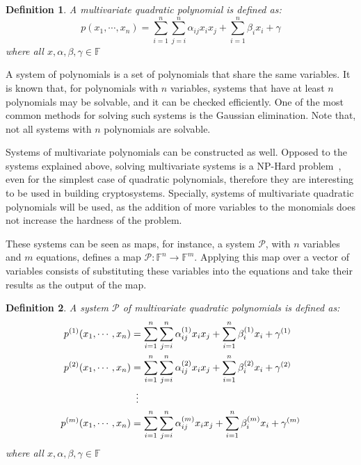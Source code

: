 \documentclass{ufsctex/ufsctex}
\newtheorem{definition}{Definition}
\begin{document}
\begin{definition}
A multivariate quadratic polynomial is defined as:
\begin{equation}
p(x_1,\cdots,x_n) = \sum_{i=1}^n \sum_{j=i}^n \alpha_{ij} x_i x_j +
	\sum_{i=1}^n \beta_i x_i + \gamma
\end{equation}
where all $x, \alpha, \beta, \gamma \in \mathbb{F}$
\end{definition}

A system of polynomials is a set of polynomials that share the same variables.
It is known that, for polynomials with $n$ variables, systems that have at
least $n$ polynomials may be solvable, and it can be checked efficiently. One
of the most common methods for solving such systems is the Gaussian
elimination. Note that, not all systems with $n$ polynomials are solvable.

Systems of multivariate polynomials can be constructed as well. Opposed to the
systems explained above, solving multivariate systems is a NP-Hard
problem~\cite{garey1979npc}, even for the simplest case of quadratic
polynomials, therefore they are interesting to be used in building
cryptosystems. Specially, systems of multivariate quadratic polynomials will be
used, as the addition of more variables to the monomials does not increase the
hardness of the problem.

These systems can be seen as maps, for instance, a system $\mathcal{P}$, with
$n$ variables and $m$ equations, defines a map $\mathcal{P}:\mathbb{F}^n \to
\mathbb{F}^m$. Applying this map over a vector of variables consists of
substituting these variables into the equations and take their results as the
output of the map.

\begin{definition}\label{def:mqsystem}
A system $\mathcal{P}$ of multivariate quadratic polynomials is defined as:
\begin{equation}\label{eq:mqsystem}
\begin{split}
p^{(1)}(x_1,\cdots,x_n) &= \sum_{i=1}^n \sum_{j=i}^n \alpha^{(1)}_{ij} x_i x_j
	+ \sum_{i=1}^n \beta^{(1)}_i x_i + \gamma^{(1)} \\
p^{(2)}(x_1,\cdots,x_n) &= \sum_{i=1}^n \sum_{j=i}^n \alpha^{(2)}_{ij} x_i x_j
	+ \sum_{i=1}^n \beta^{(2)}_i x_i + \gamma^{(2)} \\
&\vdotswithin{=} \\
p^{(m)}(x_1,\cdots,x_n) &= \sum_{i=1}^n \sum_{j=i}^n \alpha^{(m)}_{ij} x_i x_j
	+ \sum_{i=1}^n \beta^{(m)}_i x_i + \gamma^{(m)}
\end{split}
\end{equation}
where all $x, \alpha, \beta, \gamma \in \mathbb{F}$
\end{definition}
\end{document}
